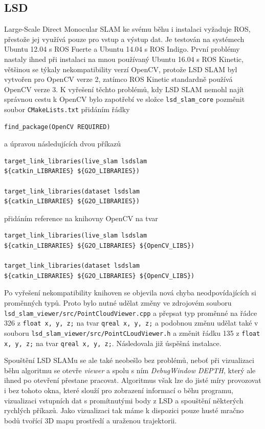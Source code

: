 \documentclass[12pt,a4paper]{report}
\begin{document}
\subsection{LSD}
Large-Scale Direct Monocular SLAM ke svému běhu i instalaci vyžaduje ROS, přestože jej využívá pouze pro vstup a výstup dat. Je testován na systémech Ubuntu 12.04 s ROS Fuerte a Ubuntu 14.04 s ROS Indigo. První problémy nastaly ihned při instalaci na mnou používaný Ubuntu 16.04 s ROS Kinetic, většinou se týkaly nekompatibility verzí OpenCV, protože LSD SLAM byl vytvořen pro OpenCV verze 2, zatímco ROS Kinetic standardně používá OpenCV verze 3. K vyřešení těchto problémů, kdy LSD SLAM nemohl najít správnou cestu k OpenCV bylo zapotřebí ve složce \texttt{lsd\_slam\_core} pozměnit soubor \texttt{CMakeLists.txt} přidáním řádky
\begin{verbatim}
find_package(OpenCV REQUIRED)
\end{verbatim}
a úpravou následujících dvou příkazů
\begin{verbatim}
target_link_libraries(live_slam lsdslam 
${catkin_LIBRARIES} ${G2O_LIBRARIES})

target_link_libraries(dataset lsdslam 
${catkin_LIBRARIES} ${G2O_LIBRARIES})
\end{verbatim}
přidáním reference na knihovny OpenCV na tvar
\begin{verbatim}
target_link_libraries(live_slam lsdslam 
${catkin_LIBRARIES} ${G2O_LIBRARIES} ${OpenCV_LIBS})

target_link_libraries(dataset lsdslam 
${catkin_LIBRARIES} ${G2O_LIBRARIES} ${OpenCV_LIBS})
\end{verbatim}

Po vyřešení nekompatibility knihoven se objevila nová chyba neodpovídajících si \newline proměnných typů. Proto bylo nutné udělat změny ve zdrojovém souboru \newline \texttt{lsd\_slam\_viewer/src/PointCloudViewer.cpp} a přepsat typ proměnné na řádce 326 z \texttt{float x, y, z;} na tvar \texttt{qreal x, y, z;} a podobnou změnu udělat také v souboru \texttt{lsd\_slam\_viewer/src/PointCLoudViewer.h} a změnit řádku 135 z \texttt{float x, y, z;} na tvar \texttt{qreal x, y, z;}. Následovala již úspěšná instalace.

Spouštění LSD SLAMu se ale také neobešlo bez problémů, neboť při vizualizaci běhu algoritmu se otevře \textit{viewer} a spolu s ním \textit{DebugWindow DEPTH}, který ale ihned po otevření přestane pracovat. Algoritmus však lze do jisté míry provozovat i bez tohoto okna, které slouží pro zobrazení informací o běhu programu, vizualizaci vstupních dat s promítnutými body z LSD a spouštění některých rychlých příkazů. Jako vizualizaci tak máme k dispozici pouze husté mračno bodů tvořící 3D mapu prostředí a uraženou trajektorii.
\end{document}
